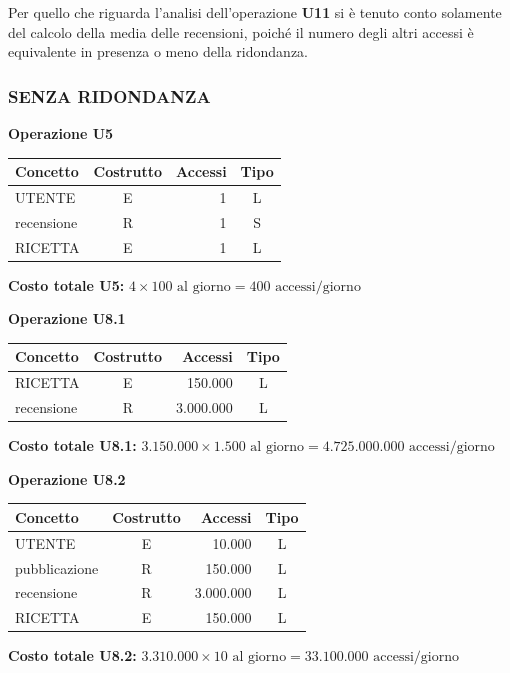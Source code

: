 Per quello che riguarda l’analisi dell’operazione \textbf{U11} si è tenuto conto solamente del calcolo della media delle recensioni, poiché il numero degli altri accessi è equivalente in presenza o meno della ridondanza.

\subsubsection*{SENZA RIDONDANZA}

\noindent\textbf{Operazione U5}
\begin{table}[H]
\centering
\renewcommand{\arraystretch}{1.2}
\setlength{\tabcolsep}{8pt}
\begin{tabularx}{\textwidth}{|X|c|r|c|}
\hline
\textbf{Concetto} & \textbf{Costrutto} & \textbf{Accessi} & \textbf{Tipo} \\
\hline
UTENTE & E & 1 & L \\
\hline
recensione & R & 1 & S \\
\hline
RICETTA & E & 1 & L \\
\hline
\end{tabularx}
\end{table}
\textbf{Costo totale U5:} $4 \times 100 \mbox{ al giorno} = 400 \mbox{ accessi/giorno}$

\vspace{1.5em}

\noindent\textbf{Operazione U8.1}
\begin{table}[H]
\centering
\renewcommand{\arraystretch}{1.2}
\setlength{\tabcolsep}{8pt}
\begin{tabularx}{\textwidth}{|X|c|r|c|}
\hline
\textbf{Concetto} & \textbf{Costrutto} & \textbf{Accessi} & \textbf{Tipo} \\
\hline
RICETTA & E & 150.000 & L \\
\hline
recensione & R & 3.000.000 & L \\
\hline
\end{tabularx}
\end{table}
\textbf{Costo totale U8.1:} $3.150.000 \times 1.500 \mbox{ al giorno} = 4.725.000.000 \mbox{ accessi/giorno}$

\vspace{1.5em}

\noindent\textbf{Operazione U8.2}
\begin{table}[H]
\centering
\renewcommand{\arraystretch}{1.2}
\setlength{\tabcolsep}{8pt}
\begin{tabularx}{\textwidth}{|X|c|r|c|}
\hline
\textbf{Concetto} & \textbf{Costrutto} & \textbf{Accessi} & \textbf{Tipo} \\
\hline
UTENTE & E & 10.000 & L \\
\hline
pubblicazione & R & 150.000 & L \\
\hline
recensione & R & 3.000.000 & L \\
\hline
RICETTA & E & 150.000 & L \\
\hline
\end{tabularx}
\end{table}
\textbf{Costo totale U8.2:} $3.310.000 \times 10 \mbox{ al giorno} = 33.100.000 \mbox{ accessi/giorno}$

